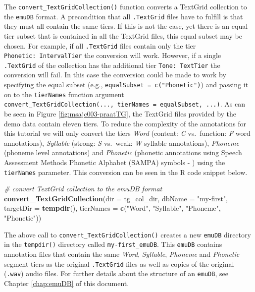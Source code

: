 \documentclass[]{book}
\newenvironment{Shaded}{\begin{snugshade}}{\end{snugshade}}
\newcommand{\CommentTok}[1]{\textcolor[rgb]{0.56,0.35,0.01}{\textit{#1}}}
\newcommand{\DataTypeTok}[1]{\textcolor[rgb]{0.13,0.29,0.53}{#1}}
\newcommand{\KeywordTok}[1]{\textcolor[rgb]{0.13,0.29,0.53}{\textbf{#1}}}
\newcommand{\NormalTok}[1]{#1}
\newcommand{\StringTok}[1]{\textcolor[rgb]{0.31,0.60,0.02}{#1}}
\begin{document}
The \texttt{convert\_TextGridCollection()} function converts a TextGrid collection to the \texttt{emuDB} format. A precondition that all \texttt{.TextGrid} files have to fulfill is that they must all contain the same tiers. If this is not the case, yet there is an equal tier subset that is contained in all the TextGrid files, this equal subset may be chosen. For example, if all \texttt{.TextGrid} files contain only the tier \texttt{Phonetic:\ IntervalTier} the conversion will work. However, if a single \texttt{.TextGrid} of the collection has the additional tier \texttt{Tone:\ TextTier} the conversion will fail. In this case the conversion could be made to work by specifying the equal subset (e.g., \texttt{equalSubset\ =\ c("Phonetic")}) and passing it on to the \texttt{tierNames} function argument \texttt{convert\_TextGridCollection(...,\ tierNames\ =\ equalSubset,\ ...)}. As can be seen in Figure \ref{fig:msajc003-praatTG}, the TextGrid files provided by the demo data contain eleven tiers. To reduce the complexity of the annotations for this tutorial we will only convert the tiers \emph{Word} (content: \emph{C} vs.~function: \emph{F} word annotations), \emph{Syllable} (strong: \emph{S} vs.~weak: \emph{W} syllable annotations), \emph{Phoneme} (phoneme level annotations) and \emph{Phonetic} (phonetic annotations using Speech Assessment Methods Phonetic Alphabet (SAMPA) symbols - \citet{wells:1997aa}) using the \texttt{tierNames} parameter. This conversion can be seen in the R code snippet below.

\begin{Shaded}
\begin{Highlighting}[]
\CommentTok{# convert TextGrid collection to the emuDB format}
\KeywordTok{convert_TextGridCollection}\NormalTok{(}\DataTypeTok{dir =}\NormalTok{ tg_col_dir,}
                           \DataTypeTok{dbName =} \StringTok{"my-first"}\NormalTok{,}
                           \DataTypeTok{targetDir =} \KeywordTok{tempdir}\NormalTok{(),}
                           \DataTypeTok{tierNames =} \KeywordTok{c}\NormalTok{(}\StringTok{"Word"}\NormalTok{, }\StringTok{"Syllable"}\NormalTok{,}
                                         \StringTok{"Phoneme"}\NormalTok{, }\StringTok{"Phonetic"}\NormalTok{))}
\end{Highlighting}
\end{Shaded}

The above call to \texttt{convert\_TextGridCollection()} creates a new \texttt{emuDB} directory in the \texttt{tempdir()} directory called \texttt{my-first\_emuDB}. This \texttt{emuDB} contains annotation files that contain the same \emph{Word}, \emph{Syllable}, \emph{Phoneme} and \emph{Phonetic} segment tiers as the original \texttt{.TextGrid} files as well as copies of the original (\texttt{.wav}) audio files. For further details about the structure of an \texttt{emuDB}, see Chapter \ref{chap:emuDB} of this document.
\end{document}
